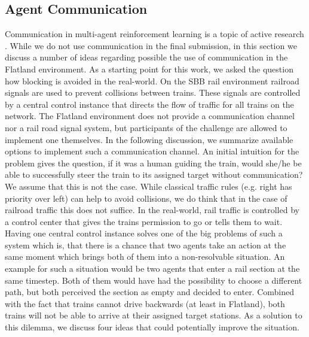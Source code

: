 \subsection*{Agent Communication}\label{agent_communication}
Communication in multi-agent reinforcement learning is a topic of active research \cite{marlsurvey}. While we do not use communication in the final submission, in this section we discuss a number of ideas regarding possible the use of communication in the Flatland environment. As a starting point for this work, we asked the question how blocking is avoided in the real-world. On the SBB rail environment railroad signals are used to prevent collisions between trains. These signals are controlled by a central control instance that directs the flow of traffic for all trains on the network.
The Flatland environment does not provide a communication channel nor a rail road signal system, but participants of the challenge are allowed to implement one themselves. In the following discussion, we summarize available options to implement such a communication channel. An initial intuition for the problem gives the question, if it was a human guiding the train, would she/he be able to successfully steer the train to its assigned target without communication?
We assume that this is not the case. While classical traffic rules (e.g. right has priority over left) can help to avoid collisions, we do think that in the case of railroad traffic this does not suffice. In the real-world, rail traffic is controlled by a control center that gives the trains permission to go or tells them to wait. Having one central control instance solves one of the big problems of such a system which is, that there is a chance that two agents take an action at the same moment which brings both of them into a non-resolvable situation. An example for such a situation would be two agents that enter a rail section at the same timestep. Both of them would have had the possibility to choose a different path, but both perceived the section as empty and decided to enter. Combined with the fact that trains cannot drive backwards (at least in Flatland), both trains will not be able to arrive at their assigned target stations. As a solution to this dilemma, we discuss four ideas that could potentially improve the situation.
